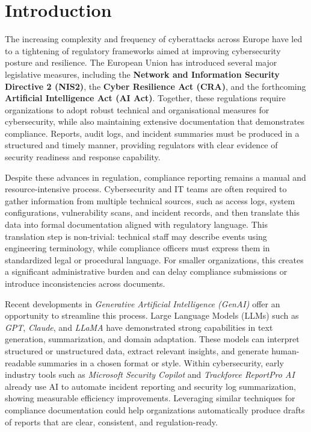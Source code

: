 \documentclass[]{UCD_CS_FYP_Report}
\begin{document}
\chapter{Introduction}
\label{chp:introduction}

The increasing complexity and frequency of cyberattacks across Europe have led to a tightening of regulatory frameworks aimed at improving cybersecurity posture and resilience. The European Union has introduced several major legislative measures, including the \textbf{Network and Information Security Directive 2 (NIS2)}\cite{NIS2Directive2023}, the \textbf{Cyber Resilience Act (CRA)}\cite{CyberResilienceAct2024}, and the forthcoming \textbf{Artificial Intelligence Act (AI Act)}\cite{AIAct2024}. Together, these regulations require organizations to adopt robust technical and organisational measures for cybersecurity, while also maintaining extensive documentation that demonstrates compliance. Reports, audit logs, and incident summaries must be produced in a structured and timely manner, providing regulators with clear evidence of security readiness and response capability.

Despite these advances in regulation, compliance reporting remains a manual and resource-intensive process. Cybersecurity and IT teams are often required to gather information from multiple technical sources, such as access logs, system configurations, vulnerability scans, and incident records, and then translate this data into formal documentation aligned with regulatory language. This translation step is non-trivial: technical staff may describe events using engineering terminology, while compliance officers must express them in standardized legal or procedural language. For smaller organizations, this creates a significant administrative burden and can delay compliance submissions or introduce inconsistencies across documents.

Recent developments in \textit{Generative Artificial Intelligence (GenAI)} offer an opportunity to streamline this process. Large Language Models (LLMs) such as \textit{GPT}, \textit{Claude}, and \textit{LLaMA} have demonstrated strong capabilities in text generation, summarization, and domain adaptation. These models can interpret structured or unstructured data, extract relevant insights, and generate human-readable summaries in a chosen format or style. Within cybersecurity, early industry tools such as \textit{Microsoft Security Copilot}\cite{MicrosoftSecurityCopilot2024} and \textit{Trackforce ReportPro AI}\cite{TrackforceReportPro2025} already use AI to automate incident reporting and security log summarization, showing measurable efficiency improvements. Leveraging similar techniques for compliance documentation could help organizations automatically produce drafts of reports that are clear, consistent, and regulation-ready.
\end{document}
